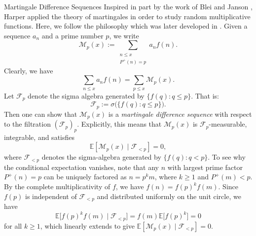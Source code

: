 \documentclass[12pt]{amsart}
\makeatletter
\renewcommand\subsection{\@startsection{subsection}{2}%
	\z@{1\linespacing\@plus1\linespacing}{\linespacing}%
	{\normalfont\bfseries\centering}}
\renewcommand{\le}{\leqslant}
\renewcommand{\leq}{\leqslant}
\renewcommand{\ge}{\geqslant}
\numberwithin{equation}{section}
\theoremstyle{plain}
\theoremstyle{definition}
\newcommand{\CM}{\mathcal{M}}
\makeatother
\begin{document}
	\subsection{Martingale Difference Sequences} \label{sec:MDS}
	Inspired in part by the work of Blei and Janson \cite{blei}, Harper \cite{harper2013limit} applied the theory of martingales in order to study random multiplicative functions. Here, we follow the philosophy which was later developed in \cite{harper2020moments}. Given a sequence $a_n$ and a prime number $p$, we write
	$$\CM_p(x) := \sum_{\substack{n \leq x \\ P^+(n) =p}}a_n f(n).$$
	Clearly, we have 
	$$\sum_{n \leq x} a_n f(n) = \sum_{p \leq x}\CM_p(x).$$ 
	Let $\mathcal F_p$ denote the sigma algebra generated by $\{f(q):q\le p\}$. That is:
	\[
	\mathcal F_p:=\sigma\big(\{f(q):q\le p\}\big).
	\]
	Then one can show that $\mathcal M_p(x)$ is a \textit{martingale difference sequence} with respect to the filtration $(\mathcal F_p)_p$. Explicitly, this means that $\mathcal{M}_p(x)$ is $\mathcal{F}_p$-measurable, integrable, and satisfies $$\mathbb{E}[\mathcal{M}_p(x) \mid \mathcal{F}_{<p}] = 0,$$ where $\mathcal{F}_{<p}$ denotes the sigma-algebra generated by $\{f(q) : q < p\}$. To see why the conditional expectation vanishes, note that any $n$ with largest prime factor $P^+(n) = p$ can be uniquely factored as $n = p^k m$, where $k \ge 1$ and $P^+(m) < p$. By the complete multiplicativity of $f$, we have $f(n) = f(p)^k f(m)$. Since $f(p)$ is independent of $\mathcal{F}_{<p}$ and distributed uniformly on the unit circle, we have
	$$ \mathbb{E}\big[f(p)^k f(m) \mid \mathcal{F}_{<p}\big] = f(m) \mathbb{E}\big[f(p)^k\big] = 0 $$
	for all $k \ge 1$, which linearly extends to give $\mathbb{E}[\mathcal{M}_p(x) \mid \mathcal{F}_{<p}] = 0$.
	
\end{document}
